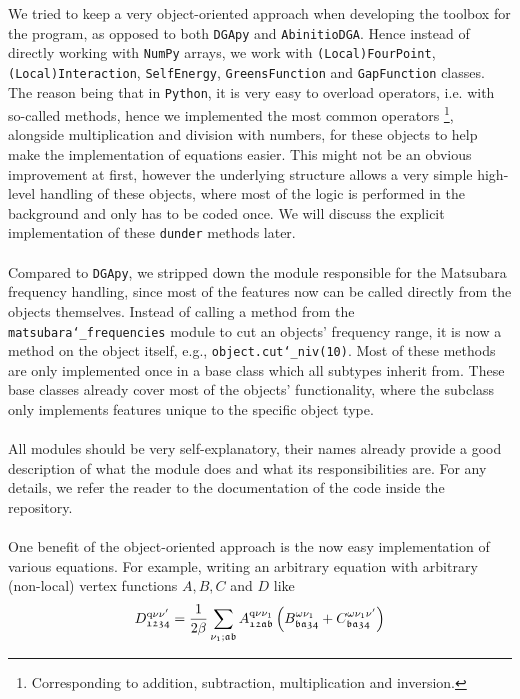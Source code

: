 \documentclass[\main/main.tex]{subfiles}
\begin{document}
We tried to keep a very object-oriented approach when developing the toolbox for the program, as opposed to both \texttt{DGApy} and \texttt{AbinitioDGA}. Hence instead of directly working with \texttt{NumPy} arrays, we work with \texttt{(Local)FourPoint}, \texttt{(Local)Interaction}, \texttt{SelfEnergy}, \texttt{GreensFunction} and \texttt{GapFunction} classes. The reason being that in \texttt{Python}, it is very easy to overload operators, i.e. with so-called  methods, hence we implemented the most common operators \footnote{Corresponding to addition, subtraction, multiplication and inversion.}, alongside multiplication and division with numbers, for these objects to help make the implementation of equations easier. This might not be an obvious improvement at first, however the underlying structure allows a very simple high-level handling of these objects, where most of the logic is performed in the background and only has to be coded once. We will discuss the explicit implementation of these \texttt{dunder} methods later.
\\\\
Compared to \texttt{DGApy}, we stripped down the module responsible for the Matsubara frequency handling, since most of the features now can be called directly from the objects themselves. Instead of calling a method from the \texttt{matsubara\char`_frequencies} module to cut an objects' frequency range, it is now a method on the object itself, e.g., \texttt{object.cut\char`_niv(10)}. Most of these methods are only implemented once in a base class which all subtypes inherit from. These base classes already cover most of the objects' functionality, where the subclass only implements features unique to the specific object type.
\\\\
All modules should be very self-explanatory, their names already provide a good description of what the module does and what its responsibilities are. For any details, we refer the reader to the documentation of the code inside the repository.
\\\\
One benefit of the object-oriented approach is the now easy implementation of various equations. For example, writing an arbitrary equation with arbitrary (non-local) vertex functions $A,B,C$ and $D$ like
\begin{align}
	D^{\text{q}\nu\nu'}_{\mathfrak{1234}}=\frac{1}{2\beta} \sum_{\nu_1;\mathfrak{ab}} A^{\text{q}\nu\nu_1}_{\mathfrak{12ab}}\left (B^{\omega\nu_1}_{\mathfrak{ba34}}+C^{\omega\nu_1\nu'}_{\mathfrak{ba34}}\right )
\end{align}
\end{document}
